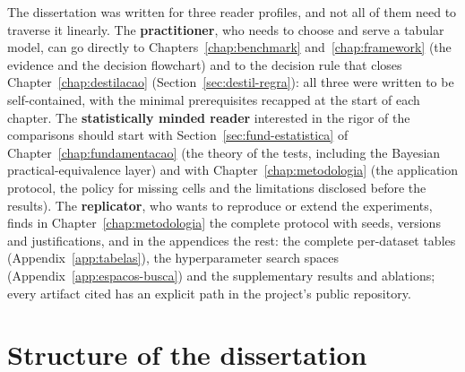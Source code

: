 The dissertation was written for three reader profiles, and not all
of them need to traverse it linearly. The \textbf{practitioner}, who
needs to choose and serve a tabular model, can go directly to
Chapters~\ref{chap:benchmark} and~\ref{chap:framework} (the evidence
and the decision flowchart) and to the decision rule that closes
Chapter~\ref{chap:destilacao} (Section~\ref{sec:destil-regra}): all
three were written to be self-contained, with the minimal
prerequisites recapped at the start of each chapter. The
\textbf{statistically minded reader} interested in the rigor of the
comparisons should start with Section~\ref{sec:fund-estatistica} of
Chapter~\ref{chap:fundamentacao} (the theory of the tests, including
the Bayesian practical-equivalence layer) and with
Chapter~\ref{chap:metodologia} (the application protocol, the policy
for missing cells and the limitations disclosed before the results).
The \textbf{replicator}, who wants to reproduce or extend the
experiments, finds in Chapter~\ref{chap:metodologia} the complete
protocol with seeds, versions and justifications, and in the
appendices the rest: the complete per-dataset tables
(Appendix~\ref{app:tabelas}), the hyperparameter search spaces
(Appendix~\ref{app:espacos-busca}) and the supplementary results and
ablations; every artifact cited has an explicit path in the
project's public repository.

\section{Structure of the dissertation}
\label{sec:intro-estrutura}

